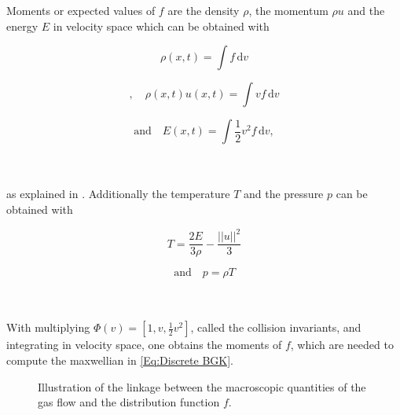 Moments or expected values of \(f\) are the density \(\rho\), the momentum \(\rho u\) and the energy \(E\) in velocity space which can be obtained with\\
\begin{minipage}{.25\textwidth}
	\begin{equation}
		\rho(x,t) = \int\! f \,\mathrm{d}v\label{Eq:Moments1} 
	\end{equation}
\end{minipage}%
\begin{minipage}{.35\textwidth}
	\begin{equation}
			\mathrm{,}\quad\rho(x,t) u(x,t) = \int\! v f \,\mathrm{d}v\label{Eq:Moments2}
	\end{equation}
\end{minipage}%
\begin{minipage}{.35\textwidth}
	\begin{equation}
	\mathrm{and}\quad E(x,t) = \int\! \frac{1}{2}v^2 f  \,\mathrm{d}v\mathrm{,}\label{Eq:Moments3}
	\end{equation}
\end{minipage}\\\\
as explained in  \cite{puppo2019kinetic}. Additionally the temperature \(T\) and the pressure \(p\) can be obtained with\\
\begin{minipage}{0.45\textwidth}
	\begin{equation}
		T = \frac{2E}{3\rho} - \frac{||u||^2}{3}
	\end{equation}
\end{minipage}%
\begin{minipage}{.45\textwidth}
	\begin{equation}
		\mathrm{and}\quad p = \rho T
	\end{equation}
\end{minipage}\\\\
With multiplying \(\Phi(v) = [1,v,\frac{1}{2} v^2]\), called the collision invariants, and integrating in velocity space, one obtains the moments of \(f\), which are needed to compute the maxwellian in \cref{Eq:Discrete BGK}.\\
\begin{wrapfigure}{r}{0.5\textwidth}
	\vspace{-10pt}
	
	\caption{Illustration of the linkage between the macroscopic quantities of the gas flow and the distribution function \(f\).}
	\label{Fig:Demo Macro}
\end{wrapfigure}
